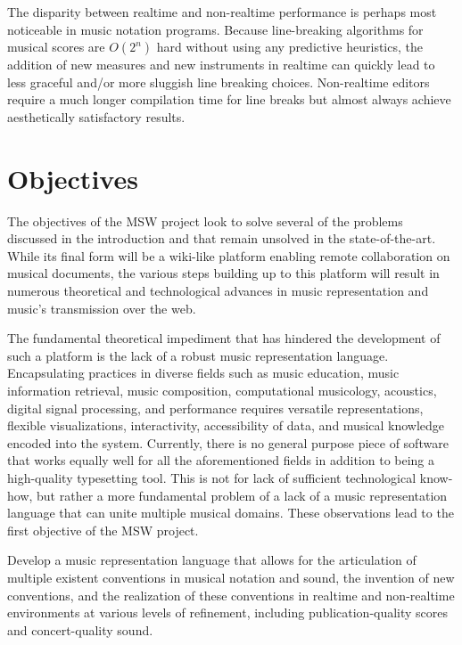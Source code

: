 \documentclass{article}
\begin{document}
The disparity between realtime and non-realtime performance is perhaps most
noticeable in music notation programs. Because line-breaking algorithms for
musical scores are $O(2^n)$ hard without using any predictive heuristics, the
addition of new measures and new instruments in realtime can quickly lead to
less graceful and/or more sluggish line breaking choices. Non-realtime
editors require a much longer compilation time for line breaks but almost
always achieve aesthetically satisfactory results.



\section{Objectives}\label{sec:objectives}
The objectives of the MSW project look to solve several of the problems
discussed in the introduction and that remain unsolved in the
state-of-the-art. While its final form will be a wiki-like platform enabling
remote collaboration on musical documents, the various steps building up to
this platform will result in numerous theoretical and technological advances
in music representation and music's transmission over the web.

The fundamental theoretical impediment that has hindered the development of
such a platform is the lack of a robust music representation language.
Encapsulating practices in diverse fields such as music education, music
information retrieval, music composition, computational musicology,
acoustics, digital signal processing, and performance requires versatile representations, flexible
visualizations, interactivity, accessibility of data, and musical knowledge
encoded into the system. Currently, there is no general purpose piece of
software that works equally well for all the aforementioned fields in
addition to being a high-quality typesetting tool. This is not for lack of
sufficient technological know-how, but rather a more fundamental problem of
a lack of a music representation language that can unite multiple musical
domains. These observations lead to the first objective of the MSW project.
\begin{objective}
Develop a music representation language that allows for the articulation of multiple
existent conventions in musical notation and sound, the invention of new
conventions, and the realization of these conventions in realtime and
non-realtime environments at various levels of refinement, including
publication-quality scores and concert-quality sound.
\end{objective}
\end{document}
